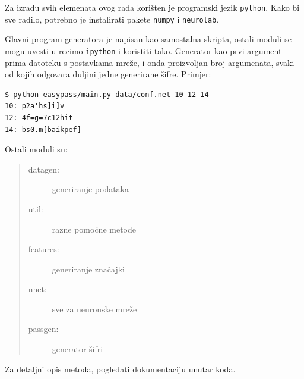 \documentclass[a4paper,twocolumn]{article}
\begin{document}
Za izradu svih elemenata ovog rada kori\v{s}ten je programski jezik
\texttt{python}. Kako bi sve radilo, potrebno je instalirati pakete
\texttt{numpy} i \texttt{neurolab}.

Glavni program generatora je napisan kao samostalna skripta, ostali moduli se
mogu uvesti u recimo \texttt{ipython} i koristiti tako. Generator kao prvi
argument prima datoteku s postavkama mre\v{z}e, i onda proizvoljan broj argumenata,
svaki od kojih odgovara duljini jedne generirane \v{s}ifre. Primjer:

\begin{verbatim}
$ python easypass/main.py data/conf.net 10 12 14
10: p2a'hs]i]v
12: 4f=g=7c12hit
14: bs0.m[baikpef]
\end{verbatim}

Ostali moduli su:
\begin{quote}
\begin{description}
    \item[datagen:] generiranje podataka
    \item[util:] razne pomo\'cne metode
    \item[features:] generiranje zna\v{c}ajki
    \item[nnet:] sve za neuronske mre\v{z}e
    \item[passgen:] generator \v{s}ifri
\end{description}
\end{quote}

Za detaljni opis metoda, pogledati dokumentaciju unutar koda.
\end{document}
